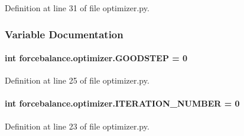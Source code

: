 Definition at line 31 of file optimizer.\-py.



\subsubsection{Variable Documentation}
\hypertarget{namespaceforcebalance_1_1optimizer_a7b0cf561a0ec911ee4b217cb0b05a28e}{
\paragraph[{G\-O\-O\-D\-S\-T\-E\-P}]{\setlength{\rightskip}{0pt plus 5cm}int forcebalance.\-optimizer.\-G\-O\-O\-D\-S\-T\-E\-P = 0}}\label{namespaceforcebalance_1_1optimizer_a7b0cf561a0ec911ee4b217cb0b05a28e}


Definition at line 25 of file optimizer.\-py.

\hypertarget{namespaceforcebalance_1_1optimizer_ac3e728fa9f2dacdcca7e1b51d9f2a49e}{
\paragraph[{I\-T\-E\-R\-A\-T\-I\-O\-N\-\_\-\-N\-U\-M\-B\-E\-R}]{\setlength{\rightskip}{0pt plus 5cm}int forcebalance.\-optimizer.\-I\-T\-E\-R\-A\-T\-I\-O\-N\-\_\-\-N\-U\-M\-B\-E\-R = 0}}\label{namespaceforcebalance_1_1optimizer_ac3e728fa9f2dacdcca7e1b51d9f2a49e}


Definition at line 23 of file optimizer.\-py.

